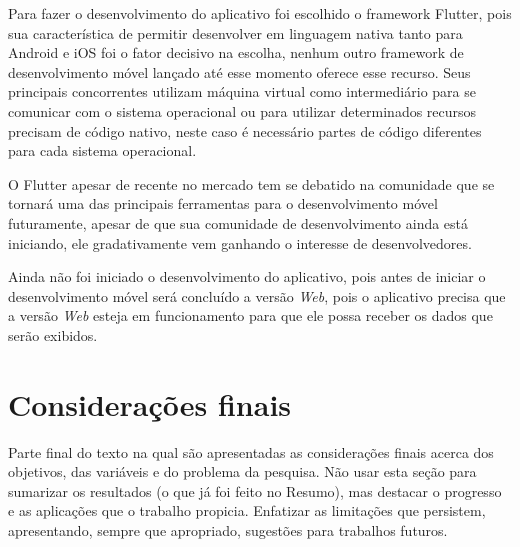 \documentclass{ifto-tex}
\begin{document}
Para fazer o desenvolvimento do aplicativo foi escolhido o framework Flutter, pois sua característica de permitir desenvolver em linguagem nativa tanto para Android e iOS foi o fator decisivo na escolha, nenhum outro framework de desenvolvimento móvel lançado até esse momento oferece esse recurso. Seus principais concorrentes utilizam máquina virtual como intermediário para se comunicar com o sistema operacional ou para utilizar determinados recursos precisam de código nativo, neste caso é necessário partes de código diferentes para cada sistema operacional.

O Flutter apesar de recente no mercado tem se debatido na comunidade que se tornará uma das principais ferramentas para o desenvolvimento móvel futuramente, apesar de que sua comunidade de desenvolvimento ainda está iniciando, ele gradativamente vem ganhando o interesse de desenvolvedores.

Ainda não foi iniciado o desenvolvimento do aplicativo, pois antes de iniciar o desenvolvimento móvel será concluído a versão \textit{Web}, pois o aplicativo precisa que a versão \textit{Web} esteja em funcionamento para que ele possa receber os dados que serão exibidos.

\chapter{Considerações finais}

	Parte final do texto na qual são apresentadas as considerações finais acerca dos objetivos, das variáveis e do problema da pesquisa. Não usar esta seção para sumarizar os resultados (o que já foi feito no Resumo), mas destacar o progresso e as aplicações que o trabalho propicia. Enfatizar as limitações que persistem, apresentando, sempre que apropriado, sugestões para trabalhos futuros.



\postextual


\end{document}
